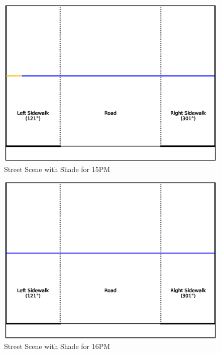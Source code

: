\documentclass[nohyperref]{article}
\theoremstyle{plain}
\theoremstyle{definition}
\theoremstyle{remark}
\begin{document}
\begin{figure}[ht]
\begin{center}
\centerline{\includegraphics[width=\columnwidth]{sidewalk_predictions/shade_at_15}}
\caption{Street Scene with Shade for 15PM}
\end{center}
\end{figure}

\begin{figure}[ht]
\begin{center}
\centerline{\includegraphics[width=\columnwidth]{sidewalk_predictions/shade_at_16}}
\caption{Street Scene with Shade for 16PM}
\end{center}
\end{figure}
\end{document}
